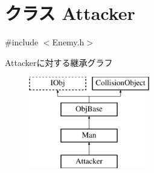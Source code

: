 \hypertarget{class_attacker}{\section{クラス Attacker}
\label{class_attacker}
}


{\ttfamily \#include $<$Enemy.\-h$>$}

Attackerに対する継承グラフ\begin{figure}[H]
\begin{center}
\leavevmode
\includegraphics[height=4.000000cm]{df/d42/class_attacker}
\end{center}
\end{figure}
